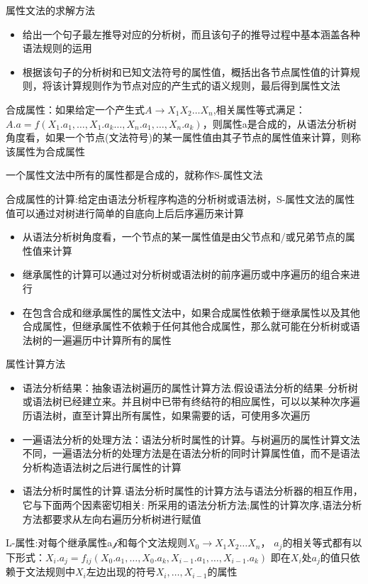 \documentclass[utf8]{ctexart}
\begin{document}
属性文法的求解方法
\begin{itemize}
    \item 给出一个句子最左推导对应的分析树，而且该句子的推导过程中基本涵盖各种语法规则的运用
    \item 根据该句子的分析树和已知文法符号的属性值，概括出各节点属性值的计算规则，将该计算规则作为节点对应的产生式的语义规则，最后得到属性文法
\end{itemize}

合成属性：如果给定一个产生式$A \rightarrow X_1X_2\dots X_n$,相关属性等式满足：$A.a=f(X_1.a_1,\dots,X_1.a_k \dots,X_n.a_1,\dots,X_n.a_k)$，则属性a是合成的，从语法分析树角度看，如果一个节点(文法符号)的某一属性值由其子节点的属性值来计算，则称该属性为合成属性

一个属性文法中所有的属性都是合成的，就称作S-属性文法

合成属性的计算:给定由语法分析程序构造的分析树或语法树，S-属性文法的属性值可以通过对树进行简单的自底向上后后序遍历来计算

\begin{itemize}
    \item 从语法分析树角度看，一个节点的某一属性值是由父节点和/或兄弟节点的属性值来计算
    \item 继承属性的计算可以通过对分析树或语法树的前序遍历或中序遍历的组合来进行
    \item 在包含合成和继承属性的属性文法中，如果合成属性依赖于继承属性以及其他合成属性，但继承属性不依赖于任何其他合成属性，那么就可能在分析树或语法树的一遍遍历中计算所有的属性
\end{itemize}

属性计算方法
\begin{itemize}
\item 语法分析结果：抽象语法树遍历的属性计算方法.假设语法分析的结果--分析树或语法树已经建立来。并且树中已带有终结符的相应属性，可以以某种次序遍历语法树，直至计算出所有属性，如果需要的话，可使用多次遍历
\item 一遍语法分析的处理方法：语法分析时属性的计算。与树遍历的属性计算文法不同，一遍语法分析的处理方法是在语法分析的同时计算属性值，而不是语法分析构造语法树之后进行属性的计算
\item 语法分析时属性的计算.语法分析时属性的计算方法与语法分析器的相互作用，它与下面两个因素密切相关:
所采用的语法分析方法;属性的计算次序,语法分析方法都要求从左向右遍历分析树进行赋值
\end{itemize}

L-属性:对每个继承属性a𝒿和每个文法规则$X_0 \rightarrow  X_1X_2 \dots X_n$，  $a_j$的相关等式都有以下形式：$X_i.a_j=f_{ij}(X_0.a_1,\dots,X_0.a_k,X_{i-1}.a_1,\dots,X_{i-1}.a_k)$
即在$X_i$处$a_j$的值只依赖于文法规则中$X_i$左边出现的符号$X_i, \dots , X_{i-1} $的属性
\end{document}
